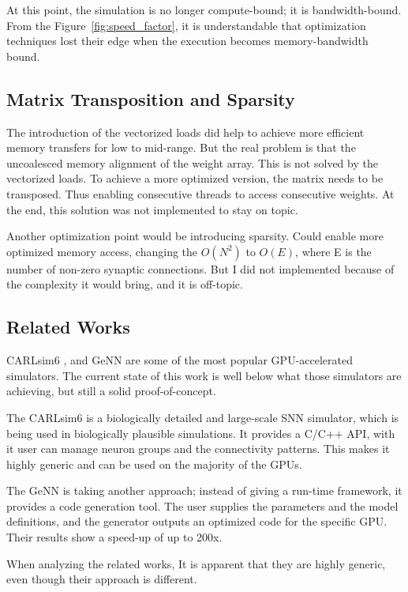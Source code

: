 \documentclass[conference]{IEEEtran}
\begin{document}
At this point, the simulation is no longer compute-bound; it is bandwidth-bound. From the Figure~\ref{fig:speed_factor}, it is understandable that optimization techniques lost their edge when the execution becomes memory-bandwidth bound.

\subsection{Matrix Transposition and Sparsity}

The introduction of the vectorized loads did help to achieve more efficient memory transfers for low to mid-range. 
But the real problem is that the uncoalesced memory alignment of the weight array. This is not solved by the vectorized loads. To achieve a more optimized version, the matrix needs to be transposed. Thus enabling consecutive threads to access consecutive weights. 
At the end, this solution was not implemented to stay on topic.

Another optimization point would be introducing sparsity. Could enable more optimized memory access, changing the $O(N^2)$ to $O(E)$, where E is the number of non-zero synaptic connections. But I did not implemented because of the complexity it would bring, and it is off-topic.

\subsection{Related Works}

CARLsim6 \cite{niedermeier2022carlsim}, and GeNN \cite{yavuz2016genn} are some of the most popular GPU-accelerated simulators.
The current state of this work is well below what those simulators are achieving, but still a solid proof-of-concept.

The CARLsim6 is a biologically detailed and large-scale SNN simulator, which is being used in biologically plausible simulations.
It provides a C/C++ API, with it user can manage neuron groups and the connectivity patterns. 
This makes it highly generic and can be used on the majority of the GPUs.

The GeNN is taking another approach; instead of giving a run-time framework, it provides a code generation tool.
The user supplies the parameters and the model definitions, and the generator outputs an optimized code for the specific GPU.
Their results show a speed-up of up to 200x. 

When analyzing the related works, 
It is apparent that they are highly generic, even though their approach is different.
\end{document}
